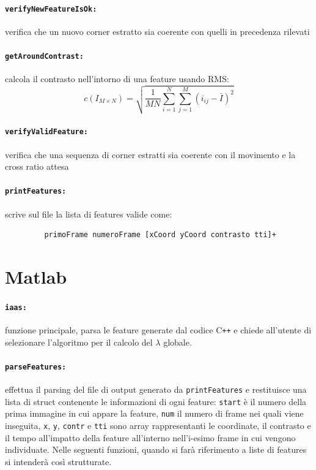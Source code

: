 \documentclass[12pt]{report}
\begin{document}
\paragraph*{\verb_verifyNewFeatureIsOk:_} verifica che un nuovo corner estratto sia coerente con quelli in precedenza rilevati

\paragraph*{\verb_getAroundContrast:_} calcola il contrasto nell'intorno di una feature usando RMS: $$ c\left(I_{M\times N}\right) = \sqrt{\frac{1}{MN}\sum_{i=1}^N\sum_{j=1}^M(i_{ij}-\bar{I})^2} $$

\paragraph*{\verb_verifyValidFeature:_} verifica che una sequenza di corner estratti sia coerente con il movimento e la cross ratio attesa

\paragraph*{\verb_printFeatures:_} scrive sul file la lista di features valide come:
\begin{verbatim}
	     primoFrame numeroFrame [xCoord yCoord contrasto tti]+
\end{verbatim}


\section{Matlab}

\paragraph*{\verb_iaas:_} funzione principale, parsa le feature generate dal codice C\verb|++| e chiede all'utente di selezionare l'algoritmo per il calcolo del $\lambda$ globale.

\paragraph*{\verb_parseFeatures:_} effettua il parsing del file di output generato da \verb|printFeatures| e restituisce una lista di struct contenente le informazioni di ogni feature: \verb|start| \`e il numero della prima immagine in cui appare la feature, \verb|num| il numero di frame nei quali viene inseguita, \verb|x|, \verb|y|, \verb|contr| e \verb|tti| sono array rappresentanti le coordinate, il contrasto e il tempo all'impatto della feature all'interno nell'i-esimo frame in cui vengono individuate. Nelle seguenti funzioni, quando si far\`a riferimento a liste di features si intender\`a cos\`i strutturate.
\end{document}
